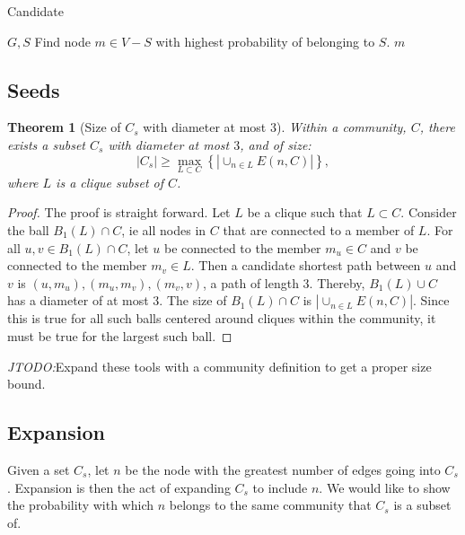 \documentclass[phd,tocprelim]{cornell}
\newtheorem{theorem}{Theorem}[section]
\newtheorem{proof}[definition]{Proof}
\renewcommand{\caption}[1]{\singlespacing\hangcaption{#1}\normalspacing}
\begin{document}
\begin{algorithm}[!h]                              %
\caption{Candidate}         %
\label{alg_candidate}                                   %
\begin{algorithmic}                        %
\REQUIRE $G, S$
\STATE Find node $m \in V-S$ with highest probability of belonging to $S$.
\RETURN $m$
\end{algorithmic}
\end{algorithm}

\subsection{Seeds}


\begin{theorem}[Size of $C_s$ with diameter at most $3$]
Within a community, $C$, there exists a subset $C_s$ with diameter at most $3$, and of size:
\begin{equation}
 |C_s| \geq \max_{L \subset C}\left\{|\cup_{n \in L} E(n, C)| \right\},
\end{equation}
where $L$ is a clique subset of $C$.
\end{theorem}
\begin{proof}
The proof is straight forward.  Let $L$ be a clique such that $ L \subset C$.  Consider the ball $B_1(L) \cap C$, ie all nodes in $C$ that are connected to a member of $L$.  For all $u, v \in B_1(L) \cap C$, let  $u$ be connected to the member $m_u \in C$ and $v$ be connected to the member $m_v \in L$.  Then a candidate shortest path between $u$ and $v$ is $(u, m_u), (m_u, m_v), (m_v, v)$, a path of length $3$.  Thereby, $B_1(L) \cup C$ has a diameter of at most $3$.  The size of $B_1(L) \cap C$ is $|\cup_{n \in L} E(n, C)|$.  Since this is true for all such balls centered around cliques within the community, it must be true for the largest such ball.
\end{proof}

{\it JTODO:}Expand these tools with a community definition to get a proper size bound.


\subsection{Expansion}


Given a set $C_s$, let $n$ be the node with the greatest number of edges going into $C_s$.  Expansion is then the act of expanding $C_s$ to include $n$.  We would like to show the probability with which $n$ belongs to the same community that $C_s$ is a subset of.
\end{document}
